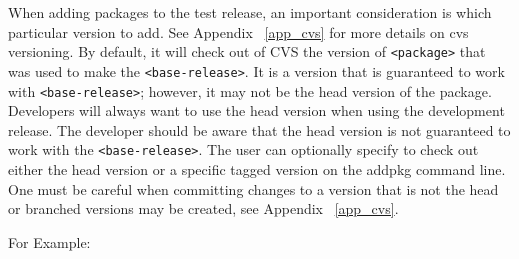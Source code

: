 \documentclass[12pt]{article}
\begin{document}
When adding packages to the test release, an important consideration 
is which particular version to add. See Appendix ~\ref{app_cvs} for
more details on cvs versioning. By default, 
it will check out of CVS the 
version of \texttt{<package>} that was used
to make the \texttt{<base-release>}.  
It is a version that is guaranteed to work with 
\texttt{<base-release>}; however, it may not be the head version of the 
package. Developers will always want to use the head
version when using the development release. 
The developer should be aware that the head version is not guaranteed to 
work with the \texttt{<base-release>}.
The user can optionally
specify to check out either the head version or a specific tagged
version on the addpkg command line. One must be careful when
committing changes to a version that is not the head or branched
versions may be created, see Appendix ~\ref{app_cvs}. 

For Example:
\end{document}
